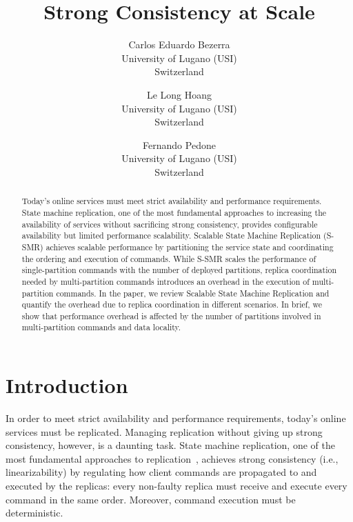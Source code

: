 \documentclass[11pt]{article}
\begin{document}
\title{Strong Consistency at Scale}

\author{
  Carlos Eduardo Bezerra\\
  University of Lugano (USI)\\
  Switzerland
  \and
  Le Long Hoang\\
  University of Lugano (USI)\\
  Switzerland
  \and
  Fernando Pedone\\
  University of Lugano (USI)\\
  Switzerland
}

\maketitle

\begin{abstract}
Today's online services must meet strict availability and performance requirements.
State machine replication, one of the most fundamental approaches to increasing the availability of services without sacrificing strong consistency, provides configurable availability but limited performance scalability.
Scalable State Machine Replication (S-SMR) achieves scalable performance by partitioning the service state and coordinating the ordering and execution of commands.
While S-SMR scales the performance of single-partition commands with the number of deployed partitions, replica coordination needed by multi-partition commands introduces an overhead in the execution of multi-partition commands.
In the paper, we review Scalable State Machine Replication and quantify the overhead due to replica coordination in different scenarios.
In brief, we show that performance overhead is affected by the number of partitions involved in multi-partition commands and data locality.
\end{abstract}

\section{Introduction}

In order to meet strict availability and performance requirements, today's online services must be replicated.
Managing replication without giving up strong consistency, however, is a daunting task.
State machine replication, one of the most fundamental approaches to replication~\cite{Lam78,Sch90}, achieves strong consistency (i.e., linearizability) by regulating how client commands are propagated to and executed by the replicas: every non-faulty replica must receive and execute every command in the same order. Moreover, command execution must be deterministic. 
\end{document}
